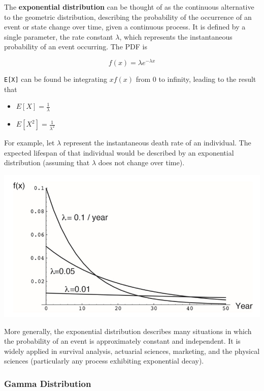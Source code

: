 \documentclass[
]{book}
\providecommand{\tightlist}{%
  \setlength{\itemsep}{0pt}\setlength{\parskip}{0pt}}
\begin{document}
The \textbf{exponential distribution} can be thought of as the continuous alternative to the geometric distribution, describing the probability of the occurrence of an event or state change over time, given a continuous process. It is defined by a single parameter, the rate constant \(\lambda\), which represents the instantaneous probability of an event occurring. The PDF is

\[f(x)=\lambda e^{-\lambda x}\]

\texttt{E{[}X{]}} can be found be integrating \(xf(x)\) from 0 to infinity, leading to the result that

\begin{itemize}
\tightlist
\item
  \(E[X] = \frac{1}{\lambda}\)
\item
  \(E[X^2] = \frac{1}{\lambda^2}\)
\end{itemize}

For example, let \(\lambda\) represent the instantaneous death rate of an individual. The expected lifespan of that individual would be described by an exponential distribution (assuming that \(\lambda\) does not change over time).

\begin{center}\includegraphics[width=0.7\linewidth]{images/prob.020} \end{center}

More generally, the exponential distribution describes many situations in which the probability of an event is approximately constant and independent. It is widely applied in survival analysis, actuarial sciences, marketing, and the physical sciences (particularly any process exhibiting exponential decay).

\hypertarget{gamma-distribution}{%
\subsubsection{\texorpdfstring{\textbf{Gamma Distribution}}{Gamma Distribution}}\label{gamma-distribution}}
\end{document}
